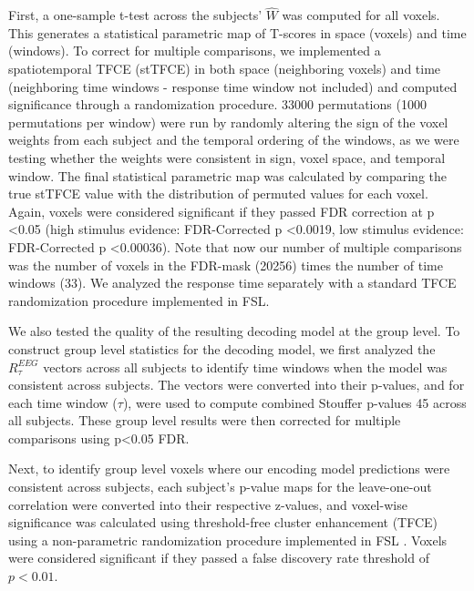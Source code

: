 First, a one-sample t-test across the subjects’ $\hat{W}$  was computed for all voxels. This generates a statistical parametric map of T-scores in space (voxels) and time (windows). To correct for multiple comparisons, we implemented a spatiotemporal TFCE (stTFCE) in both space (neighboring voxels) and time (neighboring time windows - response time window not included) and computed significance through a randomization procedure. 33000 permutations (1000 permutations per window) were run by randomly altering the sign of the voxel weights from each subject and the temporal ordering of the windows, as we were testing whether the weights were consistent in sign, voxel space, and temporal window. The final statistical parametric map was calculated by comparing the true stTFCE value with the distribution of permuted values for each voxel. Again, voxels were considered significant if they passed FDR correction at p \textless 0.05 (high stimulus evidence: FDR-Corrected p \textless 0.0019, low stimulus evidence: FDR-Corrected p \textless 0.00036). Note that now our number of multiple comparisons was the number of voxels in the FDR-mask (20256) times the number of time windows (33). We analyzed the response time separately with a standard TFCE randomization procedure implemented in FSL.

We also tested the quality of the resulting decoding model at the group level.  To construct group level statistics for the decoding model, we first analyzed the $R^{EEG}_{\tau}$ vectors across all subjects to identify time windows when the model was consistent across subjects. The vectors were converted into their p-values, and for each time window ($\tau$), were used to compute combined Stouffer p-values 45 across all subjects\cite{Darlington2000}. These group level results were then corrected for multiple comparisons using p<0.05 FDR. 

Next, to identify group level voxels where our encoding model predictions were consistent across subjects, each subject's p-value maps for the leave-one-out correlation were converted into their respective z-values, and voxel-wise significance was calculated using threshold-free cluster enhancement (TFCE) using a non-parametric randomization procedure implemented in FSL \cite{Smith2009a}. Voxels were considered significant if they passed a false discovery rate threshold of $p<0.01$. 

